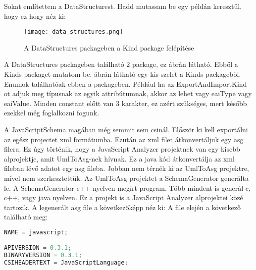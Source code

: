 \noindent

Sokat említettem a DataStructurest. Hadd mutassam be egy példán keresztül, hogy ez hogy néz ki:

\begin{figure}[!htbp]
      \caption{A DataStructures packageben a Kind package felépítése}\label{fig:data_structures_kinds}
      \centering
      \texttt{[image: data\_structures.png]}
\end{figure}

A DataStructures packageben található 2 package, ez  ábrán látható. Ebből a Kinds packaget mutatom be.
 ábrán látható egy kis szelet a Kinds packageből.
Enumok találhatóak ebben a packageben.
Például ha az ExportAndImportKind-ot adjuk meg típusnak az egyik attribútumnak, akkor az lehet vagy eaiType vagy eaiValue.
Minden constant előtt van 3 karakter, ez azért szükséges, mert később ezekkel még foglalkozni fogunk.

\noindent

A JavaScriptSchema magában még semmit sem csinál. Először ki kell exportálni az egész projectet xml formátumba.
Ezután az xml filet átkonvertáljuk egy asg filera. Ez úgy történik, hogy a JavaScript Analyzer projektnek van egy kisebb alprojektje, amit UmlToAsg-nek hívnak.
Ez a java kód átkonvertálja az xml fileban lévő adatot egy asg fileba. Jobban nem térnék ki az UmlToAsg projektre, mivel nem szerkesztettük.
Az UmlToAsg projektet a SchemaGenerator generálta le. A SchemaGenerator c++ nyelven megírt program. Több mindent is generál c, c++, vagy java nyelven.
Ez a projekt is a JavaScript Analyzer alprojektei közé tartozik.
A legenerált asg file a következőképp néz ki:
A file elején a következő található meg:
\begin{lstlisting}[caption={Asg file első sorai},label={lst:asg_file_eleje}, language={JavaScript}]
NAME = javascript;

APIVERSION = 0.3.1;
BINARYVERSION = 0.3.1;
CSIHEADERTEXT = JavaScriptLanguage;
\end{lstlisting}

